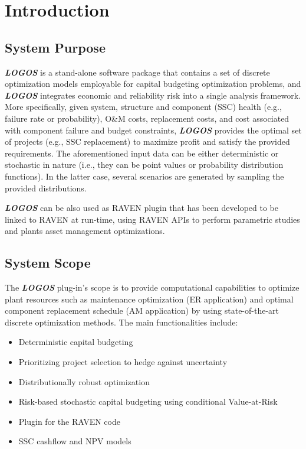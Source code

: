 \section{Introduction}
\subsection{System Purpose}
\textbf{\textit{LOGOS}} is a stand-alone software package that contains a set of discrete
optimization models employable for capital budgeting optimization
problems, and \textbf{\textit{LOGOS}} integrates economic and reliability risk into a single
analysis framework. More specifically,  given system, structure and component
(SSC) health (e.g., failure rate or probability), O\&M costs, replacement costs, and cost
associated with component failure and budget constraints, \textbf{\textit{LOGOS}} provides the optimal set
of projects (e.g., SSC replacement) to maximize profit and satisfy the provided requirements.
The aforementioned input data can be either deterministic or stochastic in nature
(i.e., they can be point values or probability distribution functions). In the latter case,
several scenarios are generated by sampling the provided distributions.

\textbf{\textit{LOGOS}} can be also used as RAVEN plugin that has been developed to be linked
to RAVEN at run-time, using RAVEN APIs to perform parametric studies and plants
asset management optimizations.

\subsection{System Scope}

The \textbf{\textit{LOGOS}} plug-in’s scope is to provide computational capabilities
to optimize plant resources such as maintenance optimization (ER application)
and optimal component replacement schedule (AM application) by using state-of-the-art
discrete optimization methods. The main functionalities include:

\begin{itemize}
  \item Deterministic capital budgeting
  \item Prioritizing project selection to hedge against uncertainty
  \item Distributionally robust optimization
  \item Risk-based stochastic capital budgeting using conditional Value-at-Risk
  \item Plugin for the RAVEN code
  \item SSC cashflow and NPV models
\end{itemize}

